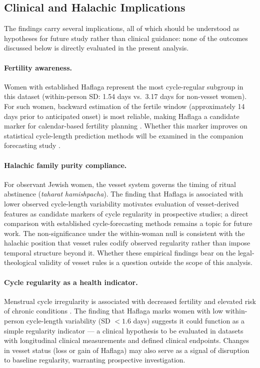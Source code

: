 \documentclass[12pt]{article}
\begin{document}
\subsection{Clinical and Halachic Implications}

The findings carry several implications, all of which should be understood as
hypotheses for future study rather than clinical guidance: none of the outcomes
discussed below is directly evaluated in the present analysis.

\paragraph{Fertility awareness.}
Women with established Haflaga represent the most cycle-regular subgroup in this
dataset (within-person SD: 1.54 days vs.\ 3.17 days for non-vesset women). For such
women, backward estimation of the fertile window (approximately 14 days prior to
anticipated onset) is most reliable, making Haflaga a candidate marker for
calendar-based fertility planning \cite{bortot2010}. Whether this marker improves
on statistical cycle-length prediction methods will be examined in the companion
forecasting study \cite{anon_planned}.

\paragraph{Halachic family purity compliance.}
For observant Jewish women, the vesset system governs the timing of ritual abstinence
(\textit{taharat hamishpacha}). The finding that Haflaga is associated with lower observed cycle-length variability
motivates evaluation of vesset-derived features as candidate markers of cycle
regularity in prospective studies; a direct comparison with established
cycle-forecasting methods remains a topic for future work.
The non-significance under the within-woman null is consistent with the halachic
position that vesset rules codify observed regularity rather than impose temporal
structure beyond it. Whether these empirical
findings bear on the legal-theological validity of vesset rules is a question outside the scope of this analysis.

\paragraph{Cycle regularity as a health indicator.}
Menstrual cycle irregularity is associated with decreased fertility and elevated risk
of chronic conditions \cite{bortot2010}. The finding that Haflaga marks women with
low within-person cycle-length variability (SD $< 1.6$ days) suggests it could
function as a simple regularity indicator --- a clinical hypothesis to be evaluated
in datasets with longitudinal clinical measurements and defined clinical endpoints.
Changes in vesset status (loss or gain of Haflaga) may also serve as a signal of
disruption to baseline regularity, warranting prospective investigation.
\end{document}
